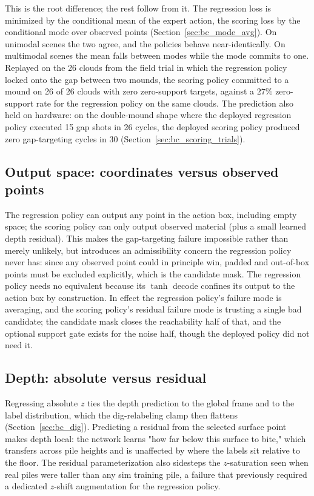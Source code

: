 This is the root difference; the rest follow from it. The regression loss is
minimized by the conditional mean of the expert action, the scoring loss by
the conditional mode over observed points
(Section~\ref{sec:bc_mode_avg}). On unimodal scenes the two agree, and the
policies behave near-identically. On multimodal scenes the mean falls between
modes while the mode commits to one. Replayed on the 26 clouds from the field
trial in which the regression policy locked onto the gap between two mounds,
the scoring policy committed to a mound on 26 of 26 clouds with zero
zero-support targets, against a $27\%$ zero-support rate for the regression
policy on the same clouds. The prediction also held on hardware: on the
double-mound shape where the deployed regression policy executed 15 gap
shots in 26 cycles, the deployed scoring policy produced zero gap-targeting
cycles in 30 (Section~\ref{sec:bc_scoring_trials}).

\subsection{Output space: coordinates versus observed points}

The regression policy can output any point in the action box, including empty
space; the scoring policy can only output observed material (plus a small
learned depth residual). This makes the gap-targeting failure impossible
rather than merely unlikely, but introduces an admissibility concern the
regression policy never has: since any observed point could in principle win,
padded and out-of-box points must be excluded explicitly, which is the
candidate mask. The regression policy needs no equivalent because its
$\tanh$ decode confines its output to the action box by construction. In
effect the regression policy's failure mode is averaging, and the scoring
policy's residual failure mode is trusting a single bad candidate; the
candidate mask closes the reachability half of that, and the optional support
gate exists for the noise half, though the deployed policy did not need it.

\subsection{Depth: absolute versus residual}

Regressing absolute $z$ ties the depth prediction to the global frame and to
the label distribution, which the dig-relabeling clamp then flattens
(Section~\ref{sec:bc_dig}). Predicting a residual from the selected surface
point makes depth local: the network learns "how far below this surface to
bite," which transfers across pile heights and is unaffected by where the
labels sit relative to the floor. The residual parameterization also
sidesteps the $z$-saturation seen when real piles were taller than any sim
training pile, a failure that previously required a dedicated
$z$-shift augmentation for the regression policy.

